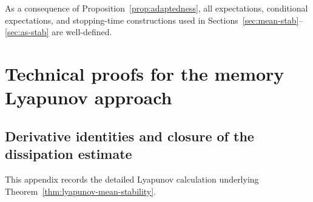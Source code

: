 \documentclass[12pt,a4paper]{article}
\theoremstyle{plain}
\theoremstyle{definition}
\theoremstyle{remark}
\begin{document}
	As a consequence of Proposition~\ref{prop:adaptedness}, all expectations,
	conditional expectations, and stopping-time constructions used in
	Sections~\ref{sec:mean-stab}--\ref{sec:as-stab} are well-defined.
	
	
	\section{Technical proofs for the memory Lyapunov approach}
	\label{app:lyapunov-details}
	
	\subsection{Derivative identities and closure of the dissipation estimate}
	\label{app:derivative-closure}
	
	This appendix records the detailed Lyapunov calculation underlying
	Theorem~\ref{thm:lyapunov-mean-stability}.
	
\end{document}
